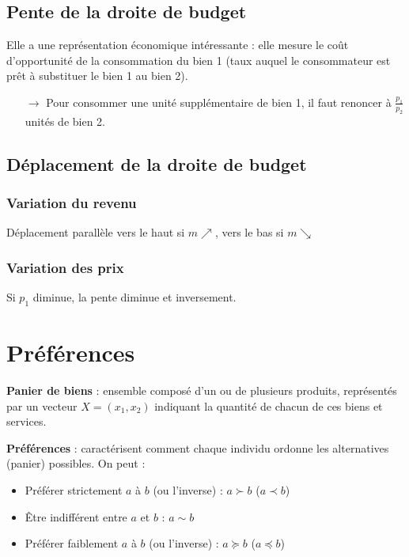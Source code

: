 \subsection{Pente de la droite de budget}

Elle a une représentation économique intéressante : elle mesure le coût d’opportunité de la consommation du bien 1 (taux auquel le consommateur est prêt à substituer le bien 1 au bien 2).
\begin{itemize}
\item[$\rightarrow$] Pour consommer une unité supplémentaire de bien 1, il faut renoncer à $\frac{p_1}{p_2}$ unités de bien 2.
\end{itemize}

\subsection{Déplacement de la droite de budget}

\subsubsection{Variation du revenu}
Déplacement parallèle vers le haut si $m \nearrow$, vers le bas si $m \searrow$

\subsubsection{Variation des prix}
Si $p_1$ diminue, la pente diminue et inversement.

\newpage
\section{Préférences}

\textbf{Panier de biens} : ensemble composé d'un ou de plusieurs produits, représentés par un vecteur $X = (x_1, x_2)$ indiquant la quantité de chacun de ces biens et services.

\textbf{Préférences} : caractérisent comment chaque individu ordonne les alternatives (panier) possibles.
On peut :
\begin{itemize}
\item Préférer strictement $a$ à $b$ (ou l'inverse) : $a \succ b$ ($a \prec b$)
\item Être indifférent entre $a$ et $b$ : $a \sim b$
\item Préférer faiblement $a$ à $b$ (ou l'inverse) : $a \succeq b$ ($a \preceq b$)
\end{itemize}

